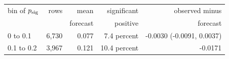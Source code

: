 \begin{tabular}{lrrrr}
\toprule
bin of $p_{\mathrm{sig}}$ & rows & mean & significant & observed minus \\
 & & forecast & positive & forecast \\
\midrule
0 to 0.1 & 6,730 & 0.077 & 7.4 percent & -0.0030 (-0.0091, 0.0037) \\
0.1 to 0.2 & 3,967 & 0.121 & 10.4 percent & -0.0171 \\
\bottomrule
\end{tabular}
